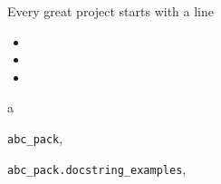 \documentclass[letterpaper,10pt,english]{sphinxmanual}
\begin{document}
\label{docstring_examples:module-abc_pack}
Every great project starts with a line
\begin{itemize}
\item {} 

\item {} 

\item {} 

\end{itemize}


\renewcommand{\indexname}{Python Module Index}
\begin{theindex}
\def\bigletter#1{{\Large\sffamily#1}\nopagebreak\vspace{1mm}}
\bigletter{a}
\item {\texttt{abc\_pack}}, \pageref{docstring_examples:module-abc_pack}
\item {\texttt{abc\_pack.docstring\_examples}}, \pageref{docstring_examples:module-abc_pack.docstring_examples}
\end{theindex}

\renewcommand{\indexname}{Index}
\printindex
\end{document}
